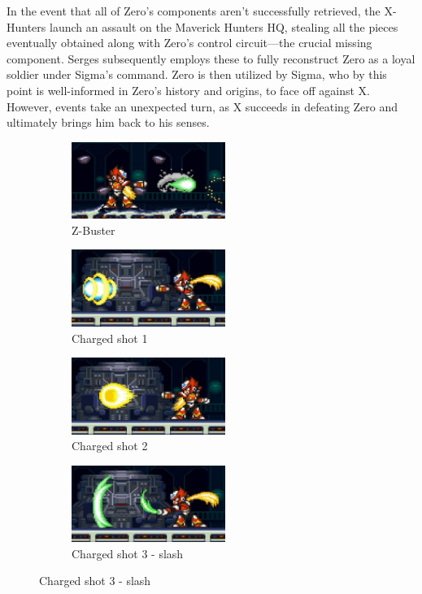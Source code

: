 In the event that all of Zero's components aren't successfully retrieved, the X-Hunters launch an assault on the Maverick Hunters HQ, stealing all the pieces eventually obtained along with Zero's control circuit—the crucial missing component. Serges subsequently employs these to fully reconstruct Zero as a loyal soldier under Sigma's command. Zero is then utilized by Sigma, who by this point is well-informed in Zero's history and origins, to face off against X. However, events take an unexpected turn, as X succeeds in defeating Zero and ultimately brings him back to his senses.
\begin{figure}[htp]
	\centering
	\begin{subfigure}{0.45\linewidth}
		\centering
		\includegraphics[height=2.5cm]{figures/X2/Hunter_stages/Zero_shot.png}
		\caption{Z-Buster}	
	\end{subfigure}
	\begin{subfigure}{0.45\linewidth}
		\centering
		\includegraphics[height=2.5cm]{figures/X2/Hunter_stages/Zero_combo_1.png}
		\caption{Charged shot 1}
	\end{subfigure}
	\begin{subfigure}{0.45\linewidth}
		\centering
		\includegraphics[height=2.5cm]{figures/X2/Hunter_stages/Zero_combo_2.png}
		\caption{Charged shot 2}
	\end{subfigure}
	\begin{subfigure}{0.45\linewidth}
		\centering
		\includegraphics[height=2.5cm]{figures/X2/Hunter_stages/Zero_combo_3.png}
		\caption{Charged shot 3 - slash}
	\end{subfigure}
\end{figure}

